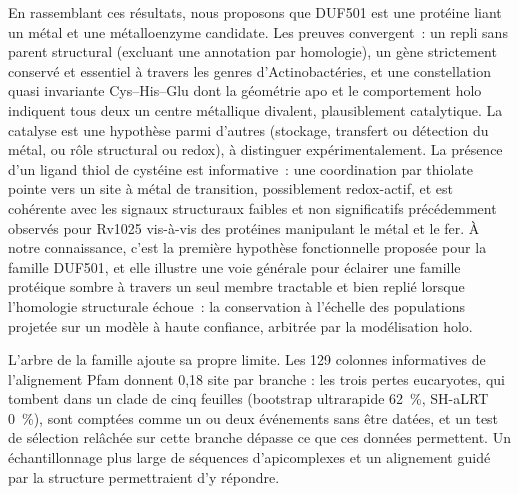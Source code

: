 \documentclass[11pt,a4paper]{article}
\begin{document}
En rassemblant ces résultats, nous proposons que DUF501 est une protéine liant un métal et une métalloenzyme candidate. Les preuves convergent~: un repli sans parent structural (excluant une annotation par homologie), un gène strictement conservé et essentiel à travers les genres d'Actinobactéries, et une constellation quasi invariante Cys--His--Glu dont la géométrie apo et le comportement holo indiquent tous deux un centre métallique divalent, plausiblement catalytique. La catalyse est une hypothèse parmi d'autres (stockage, transfert ou détection du métal, ou rôle structural ou redox), à distinguer expérimentalement. La présence d'un ligand thiol de cystéine est informative~: une coordination par thiolate pointe vers un site à métal de transition, possiblement redox-actif, et est cohérente avec les signaux structuraux faibles et non significatifs précédemment observés pour Rv1025 vis-à-vis des protéines manipulant le métal et le fer. À notre connaissance, c'est la première hypothèse fonctionnelle proposée pour la famille DUF501, et elle illustre une voie générale pour éclairer une famille protéique sombre à travers un seul membre tractable et bien replié lorsque l'homologie structurale échoue~: la conservation à l'échelle des populations projetée sur un modèle à haute confiance, arbitrée par la modélisation holo.

L'arbre de la famille ajoute sa propre limite. Les 129 colonnes informatives de l'alignement Pfam donnent 0,18 site par branche : les trois pertes eucaryotes, qui tombent dans un clade de cinq feuilles (bootstrap ultrarapide 62~\%, SH-aLRT 0~\%), sont comptées comme un ou deux événements sans être datées, et un test de sélection relâchée sur cette branche dépasse ce que ces données permettent. Un échantillonnage plus large de séquences d'apicomplexes et un alignement guidé par la structure permettraient d'y répondre.
\end{document}
